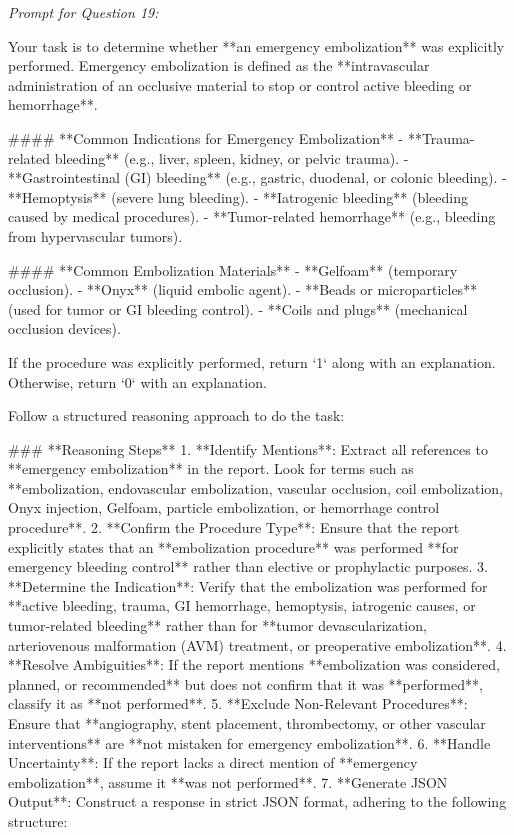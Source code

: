 \textit{\normalsize Prompt for Question  19:}
\begin{mdframed}[]
\normalsize

Your task is to determine whether **an emergency embolization** was explicitly performed. Emergency embolization is defined as the **intravascular administration of an occlusive material to stop or control active bleeding or hemorrhage**.  

#### **Common Indications for Emergency Embolization**  
- **Trauma-related bleeding** (e.g., liver, spleen, kidney, or pelvic trauma).  
- **Gastrointestinal (GI) bleeding** (e.g., gastric, duodenal, or colonic bleeding).  
- **Hemoptysis** (severe lung bleeding).  
- **Iatrogenic bleeding** (bleeding caused by medical procedures).  
- **Tumor-related hemorrhage** (e.g., bleeding from hypervascular tumors).  

#### **Common Embolization Materials**  
- **Gelfoam** (temporary occlusion).  
- **Onyx** (liquid embolic agent).  
- **Beads or microparticles** (used for tumor or GI bleeding control).  
- **Coils and plugs** (mechanical occlusion devices).  

If the procedure was explicitly performed, return `1` along with an explanation. Otherwise, return `0` with an explanation.

Follow a structured reasoning approach to do the task:

### **Reasoning Steps**  
1. **Identify Mentions**: Extract all references to **emergency embolization** in the report. Look for terms such as **embolization, endovascular embolization, vascular occlusion, coil embolization, Onyx injection, Gelfoam, particle embolization, or hemorrhage control procedure**.  
2. **Confirm the Procedure Type**: Ensure that the report explicitly states that an **embolization procedure** was performed **for emergency bleeding control** rather than elective or prophylactic purposes.  
3. **Determine the Indication**: Verify that the embolization was performed for **active bleeding, trauma, GI hemorrhage, hemoptysis, iatrogenic causes, or tumor-related bleeding** rather than for **tumor devascularization, arteriovenous malformation (AVM) treatment, or preoperative embolization**.  
4. **Resolve Ambiguities**: If the report mentions **embolization was considered, planned, or recommended** but does not confirm that it was **performed**, classify it as **not performed**.  
5. **Exclude Non-Relevant Procedures**: Ensure that **angiography, stent placement, thrombectomy, or other vascular interventions** are **not mistaken for emergency embolization**.  
6. **Handle Uncertainty**: If the report lacks a direct mention of **emergency embolization**, assume it **was not performed**.  
7. **Generate JSON Output**: Construct a response in strict JSON format, adhering to the following structure:  

\end{mdframed}


